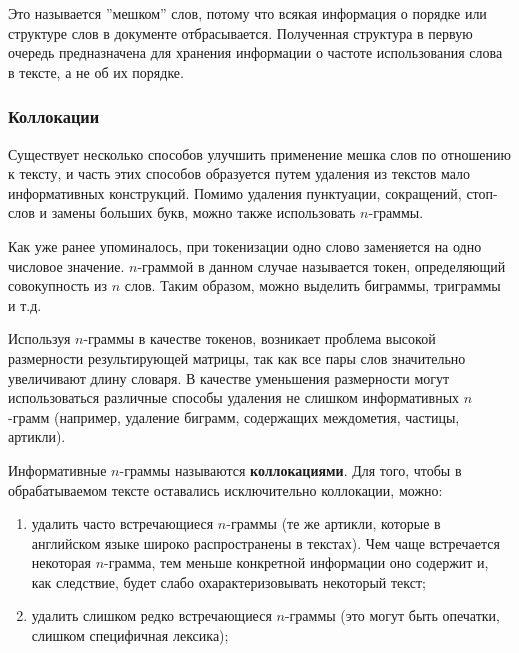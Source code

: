 \documentclass[bachelor, och, coursework]{SCWorks}
\begin{document}
            Это называется ''мешком'' слов, потому что всякая информация о
            порядке или структуре слов в документе отбрасывается. Полученная
            структура в первую очередь предназначена для хранения информации о
            частоте использования слова в тексте, а не об их порядке.

        \subsubsection{Коллокации}

            Существует несколько способов улучшить применение мешка слов по
            отношению к тексту, и часть этих способов образуется путем удаления
            из текстов мало информативных конструкций. Помимо удаления
            пунктуации, сокращений, стоп-слов и замены больших букв, можно также
            использовать $n$-граммы.
            
            Как уже ранее упоминалось, при токенизации одно слово заменяется на
            одно числовое значение. $n$-граммой в данном случае называется
            токен, определяющий совокупность из $n$ слов. Таким образом, можно
            выделить биграммы, триграммы и т.д.

            Используя $n$-граммы в качестве токенов, возникает проблема высокой
            размерности результирующей матрицы, так как все пары слов
            значительно увеличивают длину словаря. В качестве уменьшения
            размерности могут использоваться различные способы удаления не
            слишком информативных $n$-грамм (например, удаление биграмм,
            содержащих междометия, частицы, артикли).

            Информативные $n$-граммы называются \textbf{коллокациями}. Для того,
            чтобы в обрабатываемом тексте оставались исключительно коллокации,
            можно:

            \begin{enumerate}
                \item удалить часто встречающиеся $n$-граммы (те же артикли,
                которые в английском языке широко распространены в текстах). Чем
                чаще встречается некоторая $n$-грамма, тем меньше конкретной
                информации оно содержит и, как следствие, будет слабо
                охарактеризовывать некоторый текст;
                \item удалить слишком редко встречающиеся $n$-граммы (это могут
                быть опечатки, слишком специфичная лексика);
            \end{enumerate}
\end{document}
